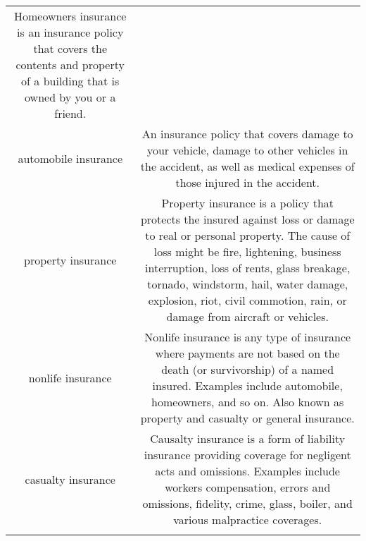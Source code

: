 \documentclass[]{book}
\theoremstyle{definition}
\theoremstyle{definition}
\theoremstyle{definition}
\theoremstyle{remark}
\begin{document}
\begin{longtable}[]{@{}cc@{}}
\begin{minipage}[t]{0.42\columnwidth}
Homeowners insurance is an insurance policy that covers the contents and
property of a building that is owned by you or a friend.\strut
\end{minipage}\tabularnewline
\begin{minipage}[t]{0.39\columnwidth}\centering\strut
automobile insurance\strut
\end{minipage} & \begin{minipage}[t]{0.42\columnwidth}\centering\strut
An insurance policy that covers damage to your vehicle, damage to other
vehicles in the accident, as well as medical expenses of those injured
in the accident.\strut
\end{minipage}\tabularnewline
\begin{minipage}[t]{0.39\columnwidth}\centering\strut
property insurance\strut
\end{minipage} & \begin{minipage}[t]{0.42\columnwidth}\centering\strut
Property insurance is a policy that protects the insured against loss or
damage to real or personal property. The cause of loss might be fire,
lightening, business interruption, loss of rents, glass breakage,
tornado, windstorm, hail, water damage, explosion, riot, civil
commotion, rain, or damage from aircraft or vehicles.\strut
\end{minipage}\tabularnewline
\begin{minipage}[t]{0.39\columnwidth}\centering\strut
nonlife insurance\strut
\end{minipage} & \begin{minipage}[t]{0.42\columnwidth}\centering\strut
Nonlife insurance is any type of insurance where payments are not based
on the death (or survivorship) of a named insured. Examples include
automobile, homeowners, and so on. Also known as property and casualty
or general insurance.\strut
\end{minipage}\tabularnewline
\begin{minipage}[t]{0.39\columnwidth}\centering\strut
casualty insurance\strut
\end{minipage} & \begin{minipage}[t]{0.42\columnwidth}\centering\strut
Causalty insurance is a form of liability insurance providing coverage
for negligent acts and omissions. Examples include workers compensation,
errors and omissions, fidelity, crime, glass, boiler, and various
malpractice coverages.\strut
\end{minipage}\tabularnewline
\begin{minipage}[t]{0.39\columnwidth}\centering\strut

\end{minipage}
\end{longtable}
\end{document}
